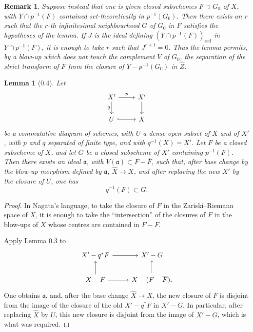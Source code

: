 \documentclass[11pt]{article}
\newtheorem*{lemma}{Lemma}
\newtheorem*{remark}{Remark}
\newcommand{\wh}[1]{\widehat{#1}}
\begin{document}
\begin{remark}
Suppose instead that one is given closed subschemes \(F\supset G_0\) of \(X\), with \(Y\cap p^{-1}(F)\) contained set-theoretically in \(p^{-1}(G_0)\). Then there exists an \(r\) such that the \(r\)-th infinitesimal neighbourhood \(G\) of \(G_0\) in \(F\) satisfies the hypotheses of the lemma. If \(J\) is the ideal defining \((Y\cap p^{-1}(F))_{\mathrm{red}}\) in \(Y\cap p^{-1}(F)\), it is enough to take \(r\) such that \(J^{r+1}=0\). Thus the lemma permits, by a blow-up which does not touch the complement \(V\) of \(G_0\), the separation of the strict transform of \(F\) from the closure of \(Y-p^{-1}(G_0)\) in \(\wh Z\).
\end{remark}

\begin{lemma}[0.4]
Let
\[
\begin{tikzcd}
X' \ar[r,"p"] \ar[d,"q"'] & X' \ar[d] \\
U \ar[r,hook] & X
\end{tikzcd}
\]
be a commutative diagram of schemes, with \(U\) a dense open subset of \(X\) and of \(X'\), with \(p\) and \(q\) separated of finite type, and with \(q^{-1}(X)=X'\). Let \(F\) be a closed subscheme of \(X\), and let \(G\) be a closed subscheme of \(X'\) containing \(p^{-1}(F)\). Then there exists an ideal \(\mathfrak a\), with \(V(\mathfrak a)\subset F-\overline{F}\), such that, after base change by the blow-up morphism defined by \(\mathfrak a\), \(\wh X\to X\), and after replacing the new \(X'\) by the closure of \(U\), one has
\[
q^{-1}(F)\subset G.
\]
\end{lemma}

\begin{proof}
In Nagata's language, to take the closure of \(F\) in the Zariski--Riemann space of \(X\), it is enough to take the ``intersection'' of the closures of \(F\) in the blow-ups of \(X\) whose centres are contained in \(F-\overline{F}\).

Apply Lemma 0.3 to
\[
\begin{tikzcd}
X'-q^*F \ar[r] & X'-G \\
X-F \ar[u] \ar[r] & X-(F-\overline{F}). \ar[u]
\end{tikzcd}
\]
One obtains \(\mathfrak a\), and, after the base change \(\wh X\to X\), the new closure of \(F\) is disjoint from the image of the closure of the old \(X'-q^*F\) in \(X'-G\). In particular, after replacing \(\wh X\) by \(U\), this new closure is disjoint from the image of \(X'-G\), which is what was required.
\end{proof}
\end{document}
